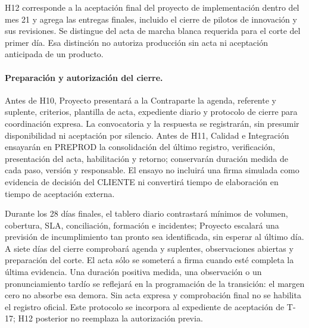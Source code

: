 H12 corresponde a la aceptación final del proyecto de implementación dentro del mes 21 y agrega las entregas finales, incluido el cierre de pilotos de innovación y sus revisiones. Se distingue del acta de marcha blanca requerida para el corte del primer día. Esa distinción no autoriza producción sin acta ni aceptación anticipada de un producto.

\paragraph{Preparación y autorización del cierre.} Antes de H10, Proyecto presentará a la Contraparte la agenda, referente y suplente, criterios, plantilla de acta, expediente diario y protocolo de cierre para coordinación expresa. La convocatoria y la respuesta se registrarán, sin presumir disponibilidad ni aceptación por silencio. Antes de H11, Calidad e Integración ensayarán en PREPROD la consolidación del último registro, verificación, presentación del acta, habilitación y retorno; conservarán duración medida de cada paso, versión y responsable. El ensayo no incluirá una firma simulada como evidencia de decisión del CLIENTE ni convertirá tiempo de elaboración en tiempo de aceptación externa.

Durante los 28 días finales, el tablero diario contrastará mínimos de volumen, cobertura, SLA, conciliación, formación e incidentes; Proyecto escalará una previsión de incumplimiento tan pronto sea identificada, sin esperar al último día. A siete días del cierre comprobará agenda y suplentes, observaciones abiertas y preparación del corte. El acta sólo se someterá a firma cuando esté completa la última evidencia. Una duración positiva medida, una observación o un pronunciamiento tardío se reflejará en la programación de la transición: el margen cero no absorbe esa demora. Sin acta expresa y comprobación final no se habilita el registro oficial. Este protocolo se incorpora al expediente de aceptación de T-17; H12 posterior no reemplaza la autorización previa.\parencite[arts.~17--18, pp.~12--13]{bases-admin}

